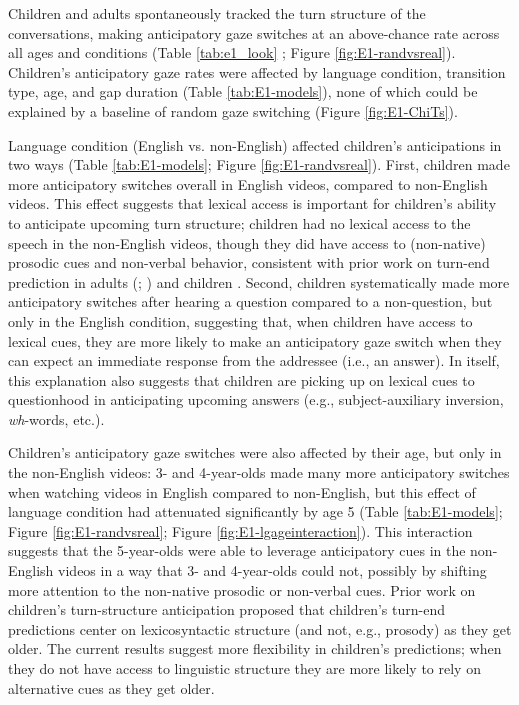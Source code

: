 \documentclass[authoryear, 12pt]{elsarticle}
\begin{document}
Children and adults spontaneously tracked the turn structure of the conversations, making anticipatory gaze switches at an above-chance rate across all ages and conditions (Table \ref{tab:e1_look} ; Figure \ref{fig:E1-randvsreal}). Children's anticipatory gaze rates were affected by language condition, transition type, age, and gap duration (Table \ref{tab:E1-models}), none of which could be explained by a baseline of random gaze switching (Figure \ref{fig:E1-ChiTs}).

Language condition (English vs. non-English) affected children's anticipations in two ways (Table \ref{tab:E1-models};  Figure \ref{fig:E1-randvsreal}). First, children made more anticipatory switches overall in English videos, compared to non-English videos. This effect suggests that lexical access is important for children's ability to anticipate upcoming turn structure; children had no lexical access to the speech in the non-English videos, though they did have access to (non-native) prosodic cues and non-verbal behavior, consistent with prior work on turn-end prediction in adults (\citealp{de-ruiter2006}; \citealp{magyari2012}) and children \citep{keitel2013}. Second, children systematically made more anticipatory switches after hearing a question compared to a non-question, but only in the English condition, suggesting that, when children have access to lexical cues, they are more likely to make an anticipatory gaze switch when they can expect an immediate response from the addressee (i.e., an answer). In itself, this explanation also suggests that children are picking up on lexical cues to questionhood in anticipating upcoming answers (e.g., subject-auxiliary inversion, \textit{wh}-words, etc.).

Children's anticipatory gaze switches were also affected by their age, but only in the non-English videos: 3- and 4-year-olds made many more anticipatory switches when watching videos in English compared to non-English, but this effect of language condition had attenuated significantly by age 5 (Table \ref{tab:E1-models};  Figure \ref{fig:E1-randvsreal}; Figure \ref{fig:E1-lgageinteraction}). This interaction suggests that the 5-year-olds were able to leverage anticipatory cues in the non-English videos in a way that 3- and 4-year-olds could not, possibly by shifting more attention to the non-native prosodic or non-verbal cues. Prior work on children's turn-structure anticipation proposed that children's turn-end predictions center on lexicosyntactic structure (and not, e.g., prosody) as they get older. The current results suggest more flexibility in children's predictions; when they do not have access to linguistic structure they are more likely to rely on alternative cues as they get older.
\end{document}
